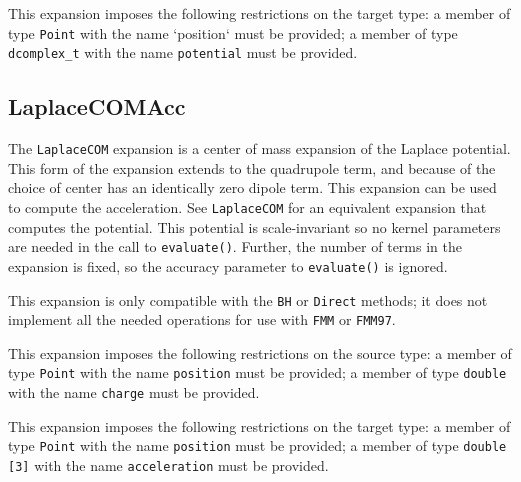 This expansion imposes the following restrictions on the target type: a
member of type {\tt Point} with the name `position` must be provided; a member
of
type {\tt dcomplex\_t} with the name {\tt potential} must be provided.

\subsection{LaplaceCOMAcc}

The {\tt LaplaceCOM} expansion is a center of mass expansion of the Laplace
potential. This form of the expansion extends to the quadrupole term, and
because of the choice of center has an identically zero dipole term. This
expansion can be used to compute the acceleration. See {\tt LaplaceCOM} for an
equivalent expansion that computes the potential. This potential is
scale-invariant so no kernel parameters are needed in the call to
{\tt evaluate()}. Further, the number of terms in the expansion is fixed, so the
accuracy parameter to {\tt evaluate()} is ignored.

This expansion is only compatible with the {\tt BH} or {\tt Direct} methods;
it does not implement all the needed operations for use with {\tt FMM} or
{\tt FMM97}.

This expansion imposes the following restrictions on the source type: a
member of type {\tt Point} with the name {\tt position} must be provided; a
member of  type {\tt double} with the name {\tt charge} must be provided.

This expansion imposes the following restrictions on the target type: a
member of type {\tt Point} with the name {\tt position} must be provided;
a member of
type {\tt double [3]} with the name {\tt acceleration} must be provided.